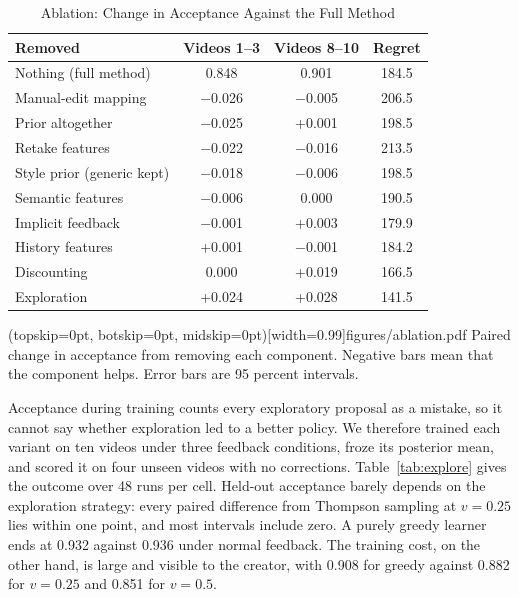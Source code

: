 \documentclass{ieeeaccess}
\begin{document}
\begin{table}[t]
\caption{Ablation: Change in Acceptance Against the Full Method}
\label{tab:ablation}
\setlength{\tabcolsep}{3pt}
\centering
\begin{tabular}{|l|c|c|c|}
\hline
Removed & Videos 1--3 & Videos 8--10 & Regret \\
\hline
Nothing (full method) & 0.848 & 0.901 & 184.5 \\
\hline
Manual-edit mapping & $-$0.026 & $-$0.005 & 206.5 \\
Prior altogether & $-$0.025 & +0.001 & 198.5 \\
Retake features & $-$0.022 & $-$0.016 & 213.5 \\
Style prior (generic kept) & $-$0.018 & $-$0.006 & 198.5 \\
Semantic features & $-$0.006 & 0.000 & 190.5 \\
Implicit feedback & $-$0.001 & +0.003 & 179.9 \\
History features & +0.001 & $-$0.001 & 184.2 \\
Discounting & 0.000 & +0.019 & 166.5 \\
Exploration & +0.024 & +0.028 & 141.5 \\
\hline
\end{tabular}
\end{table}

\Figure[t!](topskip=0pt, botskip=0pt, midskip=0pt)[width=0.99\columnwidth]{figures/ablation.pdf}
{Paired change in acceptance from removing each component. Negative bars mean that the component helps. Error bars are 95 percent intervals.\label{fig:ablation}}

Acceptance during training counts every exploratory proposal as a mistake, so it cannot say whether exploration led to a better policy. We therefore trained each variant on ten videos under three feedback conditions, froze its posterior mean, and scored it on four unseen videos with no corrections. Table~\ref{tab:explore} gives the outcome over 48 runs per cell. Held-out acceptance barely depends on the exploration strategy: every paired difference from Thompson sampling at $v=0.25$ lies within one point, and most intervals include zero. A purely greedy learner ends at 0.932 against 0.936 under normal feedback. The training cost, on the other hand, is large and visible to the creator, with 0.908 for greedy against 0.882 for $v=0.25$ and 0.851 for $v=0.5$.
\end{document}

